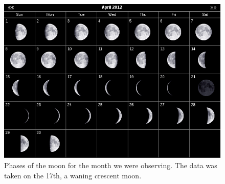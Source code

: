 \begin{figure}[htb]
\begin{center}
\includegraphics[scale=0.6]{figs/moon.png}
\caption{Phases of the moon for the month we were observing. The data was
taken on the 17th, a waning crescent moon.}
\label{moooon}
\end{center}
\end{figure}





